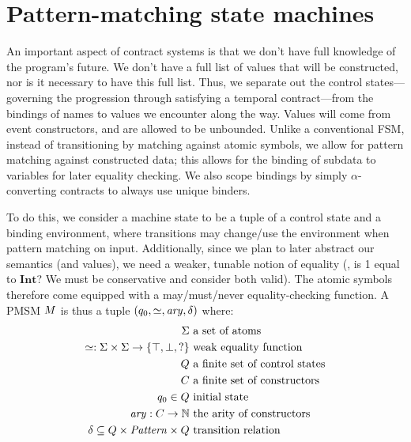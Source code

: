\section{Pattern-matching state machines}
\FloatBarrier

An important aspect of contract systems is that we don't have full knowledge of the program's future.
%
We don't have a full list of values that will be constructed, nor is it necessary to have this full list.
%
Thus, we separate out the control states---governing the progression through satisfying a temporal contract---from the bindings of names to values we encounter along the way.
%
Values will come from event constructors, and are allowed to be unbounded.
%
Unlike a conventional FSM, instead of transitioning by matching against atomic symbols, we allow for pattern matching against constructed data; this allows for the binding of subdata to variables for later equality checking.
%
We also scope bindings by simply $\alpha$-converting contracts to always use unique binders.
%

To do this, we consider a machine state to be a tuple of a control state and a binding environment, where transitions may change/use the environment when pattern matching on input.
%
Additionally, since we plan to later abstract our semantics (and values), we need a weaker, tunable notion of equality (\eg, is 1 equal to $\mathbf{Int}$? We must be conservative and consider both valid).
%
The atomic symbols therefore come equipped with a may/must/never equality-checking function.
%
A PMSM $M$ is thus a tuple $(q_0, \simeq, \mathit{ary}, \delta)$ where:
\begin{align*}
  \Sigma &\text{ a set of atoms} \\
  \simeq : \Sigma \times \Sigma \to \{\top, \bot, ?\} &\text{ weak equality function}\\
  Q &\text{ a finite set of control states} \\
  C &\text{ a finite set of constructors} \\
  q_0 \in Q &\text{ initial state} \\
  \mathit{ary} : C \to {\mathbb N}&\text{ the arity of constructors} \\
  \delta \subseteq Q \times \mathit{Pattern} \times Q & \text{ transition relation}\\[2pt]
\end{align*}

